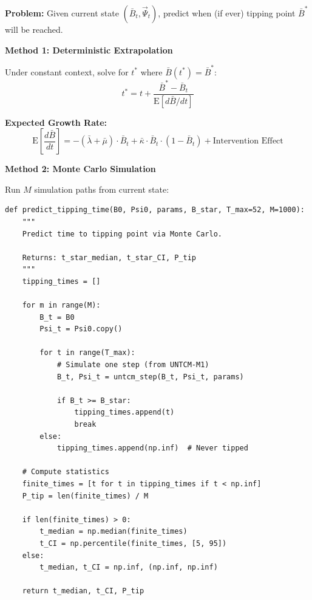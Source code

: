 \begin{tcolorbox}[colback=green!5!white, colframe=green!75!black,
    title=\textbf{Application UNTCM-E2: Tipping Point Prediction}]

\textbf{Problem:} Given current state $(\bar{B}_t, \vec{\Psi}_t)$, predict when (if ever) tipping point $\bar{B}^*$ will be reached.

\textbf{Method 1: Deterministic Extrapolation}

Under constant context, solve for $t^*$ where $\bar{B}(t^*) = \bar{B}^*$:
\begin{equation}
t^* = t + \frac{\bar{B}^* - \bar{B}_t}{\text{E}[d\bar{B}/dt]}
\end{equation}

\textbf{Expected Growth Rate:}
\begin{equation}
\text{E}\left[\frac{d\bar{B}}{dt}\right] = -(\bar{\lambda} + \bar{\mu}) \cdot \bar{B}_t + \bar{\kappa} \cdot \bar{B}_t \cdot (1 - \bar{B}_t) + \text{Intervention Effect}
\end{equation}

\textbf{Method 2: Monte Carlo Simulation}

Run $M$ simulation paths from current state:
\begin{verbatim}
def predict_tipping_time(B0, Psi0, params, B_star, T_max=52, M=1000):
    """
    Predict time to tipping point via Monte Carlo.

    Returns: t_star_median, t_star_CI, P_tip
    """
    tipping_times = []

    for m in range(M):
        B_t = B0
        Psi_t = Psi0.copy()

        for t in range(T_max):
            # Simulate one step (from UNTCM-M1)
            B_t, Psi_t = untcm_step(B_t, Psi_t, params)

            if B_t >= B_star:
                tipping_times.append(t)
                break
        else:
            tipping_times.append(np.inf)  # Never tipped

    # Compute statistics
    finite_times = [t for t in tipping_times if t < np.inf]
    P_tip = len(finite_times) / M

    if len(finite_times) > 0:
        t_median = np.median(finite_times)
        t_CI = np.percentile(finite_times, [5, 95])
    else:
        t_median, t_CI = np.inf, (np.inf, np.inf)

    return t_median, t_CI, P_tip
\end{verbatim}


\end{tcolorbox}
